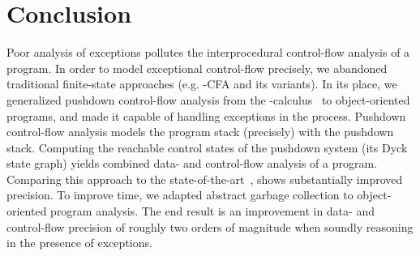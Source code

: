 \section{Conclusion} \label{sec:conclusion}

Poor analysis of exceptions pollutes the interprocedural control-flow analysis
of a program.
In order to model exceptional control-flow precisely, we abandoned traditional
finite-state approaches (e.g. -CFA and its variants).
In its place, we generalized pushdown control-flow analysis from the
-calculus~\cite{Earl:2012:IPDCFA} to object-oriented programs, and
made it capable of handling exceptions in the process.
Pushdown control-flow analysis models the program stack (precisely) with the
pushdown stack.
Computing the reachable control states of the pushdown system (its Dyck state
graph) yields combined data- and control-flow analysis of a program.
Comparing this approach to the
state-of-the-art~\cite{mattmight:Bravenboer:2009:Exceptions}, shows
substantially improved precision.
To improve time, we adapted abstract garbage collection to object-oriented
program analysis.
The end result is an improvement in data- and control-flow precision of roughly
two orders of magnitude when soundly reasoning  in the presence of exceptions.




